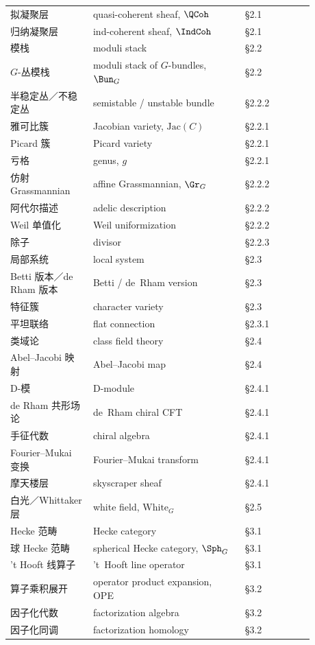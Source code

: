 \begin{center}
\begin{longtable}{@{}>{\raggedright\arraybackslash}p{0.24\linewidth}>{\raggedright\arraybackslash}p{0.44\linewidth}>{\raggedright\arraybackslash}p{0.20\linewidth}@{}}
拟凝聚层 & quasi-coherent sheaf, $\QCoh$ & §2.1 \\
归纳凝聚层 & ind-coherent sheaf, $\IndCoh$ & §2.1 \\
模栈 & moduli stack & §2.2 \\
$G$-丛模栈 & moduli stack of $G$-bundles, $\Bun_{G}$ & §2.2 \\
半稳定丛／不稳定丛 & semistable / unstable bundle & §2.2.2 \\
雅可比簇 & Jacobian variety, $\mathrm{Jac}(C)$ & §2.2.1 \\
Picard 簇 & Picard variety & §2.2.1 \\
亏格 & genus, $g$ & §2.2.1 \\
仿射 Grassmannian & affine Grassmannian, $\Gr_{G}$ & §2.2.2 \\
阿代尔描述 & adelic description & §2.2.2 \\
Weil 单值化 & Weil uniformization & §2.2.2 \\
除子 & divisor & §2.2.3 \\
局部系统 & local system & §2.3 \\
Betti 版本／de Rham 版本 & Betti / de~Rham version & §2.3 \\
特征簇 & character variety & §2.3 \\
平坦联络 & flat connection & §2.3.1 \\
类域论 & class field theory & §2.4 \\
Abel--Jacobi 映射 & Abel--Jacobi map & §2.4 \\
D-模 & D-module & §2.4.1 \\
de Rham 共形场论 & de~Rham chiral CFT & §2.4.1 \\
手征代数 & chiral algebra & §2.4.1 \\
Fourier--Mukai 变换 & Fourier--Mukai transform & §2.4.1 \\
摩天楼层 & skyscraper sheaf & §2.4.1 \\
白光／Whittaker 层 & white field, $\mathrm{White}_{G}$ & §2.5 \\
Hecke 范畴 & Hecke category & §3.1 \\
球 Hecke 范畴 & spherical Hecke category, $\Sph_{G}$ & §3.1 \\
't Hooft 线算子 & 't~Hooft line operator & §3.1 \\
算子乘积展开 & operator product expansion, OPE & §3.2 \\
因子化代数 & factorization algebra & §3.2 \\
因子化同调 & factorization homology & §3.2 \\

\end{longtable}
\end{center}
